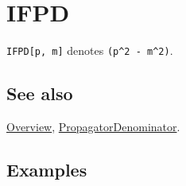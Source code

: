 \documentclass[../FeynCalcManual.tex]{subfiles}
\begin{document}
\hypertarget{ifpd}{%
\section{IFPD}\label{ifpd}}

\texttt{IFPD[\allowbreak{}p,\ \allowbreak{}m]} denotes
\texttt{(p^2 - m^2)}.

\subsection{See also}

\hyperlink{toc}{Overview},
\hyperlink{propagatordenominator}{PropagatorDenominator}.

\subsection{Examples}
\end{document}
